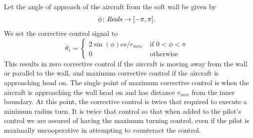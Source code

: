 \documentclass[11pt]{article}
\begin{document}
Let the angle of approach of the aircraft from the soft wall be given by
\[
\phi \colon \mbox{\textit{Reals}} \to [-\pi, \pi].
\]
We set the corrective control signal to
\[
\dot{\theta}_s = \left \{
\begin{array}{ll}
2 \sin(\phi) c s/r_{min}& \mbox{ if } 0 < \phi < \pi\\
0 & \mbox{ otherwise}
\end{array}
\right .
\]
This results in zero corrective control if the aircraft is moving
away from the wall or parallel to the wall, and maximum corrective
control if the aircraft is approaching head on.  The single point
of maximum corrective control is when the aircraft is approaching
the wall head on and has distance $r_{min}$ from the inner boundary.
At this point, the corrective control is twice that required to
execute a minimum radius turn.  It is twice that control so that
when added to the pilot's control we are assured of having
the maximum turning control, even if the pilot is maximally
uncooperative in attempting to counteract the control.
\end{document}
